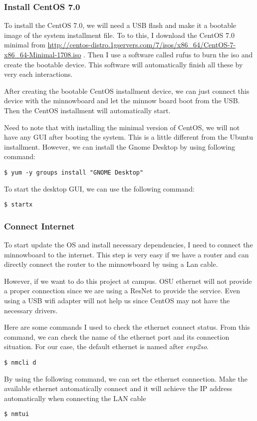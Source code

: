 \documentclass[letterpaper,10pt,onecolumn]{IEEEtran}
\begin{document}
\subsubsection{Install CentOS 7.0}
To install the CentOS 7.0, we will need a USB flash and make it a bootable image of the system installment file. To to this, I download the CentOS 7.0 minimal from \url{http://centos-distro.1gservers.com/7/isos/x86_64/CentOS-7-x86_64-Minimal-1708.iso} . Then I use a software called rufus to burn the iso and create the bootable device. This software will automatically finish all these by very each interactions.

After creating the bootable CentOS installment device, we can just connect this device with the minnowboard and let the minnow board boot from the USB. Then the CentOS installment will automatically start.

Need to note that with installing the minimal version of CentOS, we will not have any GUI after booting the system. This is a little different from the Ubuntu installment. However, we can install the Gnome Desktop by using following command:
\begin{verbatim}
$ yum -y groups install "GNOME Desktop"
\end{verbatim}
To start the desktop GUI, we can use the following command:
\begin{verbatim}
$ startx
\end{verbatim}
\subsubsection{Connect Internet}
To start update the OS and install necessary dependencies, I need to connect the minnowboard to the internet. This step is very easy if we have a router and can directly connect the router to the minnowboard by using a Lan cable.

However, if we want to do this project at campus. OSU ethernet will not provide a proper connection since we are using a ResNet to provide the service. Even using a USB wifi adapter will not help us since CentOS may not have the necessary drivers.

Here are some commands I used to check the ethernet connect status. From this command, we can check the name of the ethernet port and its connection situation. For our case, the default ethernet is named after \emph{enp2so}.
\begin{verbatim}
$ nmcli d	
\end{verbatim}
By using the following command, we can set the ethernet connection. Make the available ethernet automatically connect and it will achieve the IP address automatically when connecting the LAN cable
\begin{verbatim}
$ nmtui
\end{verbatim}
\end{document}
